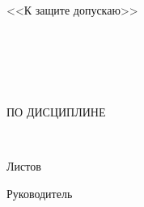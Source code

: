 \begin{ESKDtitlePage}
    \begin{center}
        \gpiMinEdu \\
        \gpiEdu \\
        \gpiKaf \\
    \end{center}

    \vfill

    \begin{flushright}
        \begin{minipage}[t]{.45\textwidth}
            <<К защите допускаю>> \\
            \gpiHeadDepartmentInfo \\
            \underline{\hspace{3cm}} \gpiHeadDepartmentName~\gpiHeadDepartmentSurname \\
            \PageTitleDateField
        \end{minipage}
    \end{flushright}

    \vfill

    \begin{center}
        \textbf{\gpiTopic} \\
    \end{center}

    \vfill

    \begin{center}
        \gpiDocTopic \\
        ПО ДИСЦИПЛИНЕ \gpiDiscipline \\
    \end{center}

    \vfill

    \begin{center}
        \textbf{\gpiCode} \\
        
    \end{center}

    \begin{flushright}
        \begin{minipage}[t]{.45\textwidth}
            Листов \pageref{LastPage} \\
        \end{minipage}
    \end{flushright}

    \vfill

    \begin{flushright}
        \begin{minipage}[t]{.49\textwidth}
            \begin{minipage}[t]{.75\textwidth}
                \begin{flushright}
                    Руководитель


\end{flushright}
\end{minipage}
\end{minipage}
\end{flushright}
\end{ESKDtitlePage}
